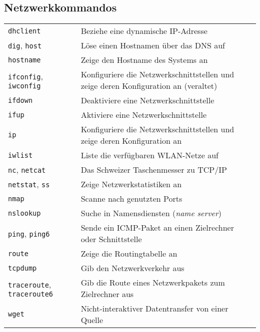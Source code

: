 \documentclass[10pt,a4paper]{article}
\begin{document}
\begin{multicols}{2}

\section{Netzwerkkommandos}
\begin{tabular}{ p{2.5cm} p{8.5cm} }
  \hline
  \texttt{dhclient} & Beziehe eine dynamische IP-Adresse \\
  \rowcolor{Gray}
  \texttt{dig}, \texttt{host} & Löse einen Hostnamen über das DNS auf \\
  \texttt{hostname} & Zeige den Hostname des Systems an \\
  \rowcolor{Gray}
  \texttt{ifconfig}, \texttt{iwconfig} & Konfiguriere die Netzwerkschnittstellen und zeige deren Konfiguration an (veraltet)\\
  \texttt{ifdown} & Deaktiviere eine Netzwerkschnittstelle \\
  \rowcolor{Gray}
  \texttt{ifup} & Aktiviere eine Netzwerkschnittstelle\\
  \texttt{ip} & Konfiguriere die Netzwerkschnittstellen und zeige deren Konfiguration an \\
  \rowcolor{Gray}
  \texttt{iwlist} & Liste die verfügbaren WLAN-Netze auf\\
  \texttt{nc}, \texttt{netcat} & Das Schweizer Taschenmesser zu TCP/IP \\
  \rowcolor{Gray}
  \texttt{netstat}, \texttt{ss} & Zeige Netzwerkstatistiken an \\
  \texttt{nmap} & Scanne nach genutzten Ports \\
  \rowcolor{Gray}
  \texttt{nslookup} & Suche in Namensdiensten (\textit{name server}) \\
  \texttt{ping}, \texttt{ping6} & Sende ein ICMP-Paket an einen Zielrechner oder Schnittstelle \\
  \rowcolor{Gray}
  \texttt{route} & Zeige die Routingtabelle an \\
  \texttt{tcpdump} & Gib den Netzwerkverkehr aus \\
  \rowcolor{Gray}
  \texttt{traceroute}, \texttt{traceroute6} & Gib die Route eines Netzwerkpakets zum Zielrechner aus \\
  \texttt{wget} & Nicht-interaktiver Datentransfer von einer Quelle\\
  \hline
\end{tabular}



\end{multicols}
\end{document}
